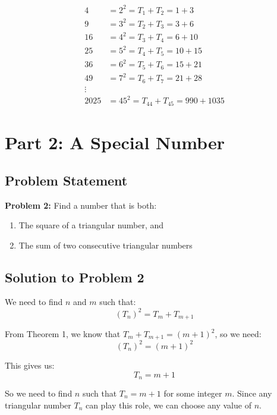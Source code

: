 \documentclass[12pt]{article}
\begin{document}
\begin{align*}
4 &= 2^2 = T_1 + T_2 = 1 + 3 \\
9 &= 3^2 = T_2 + T_3 = 3 + 6 \\
16 &= 4^2 = T_3 + T_4 = 6 + 10 \\
25 &= 5^2 = T_4 + T_5 = 10 + 15 \\
36 &= 6^2 = T_5 + T_6 = 15 + 21 \\
49 &= 7^2 = T_6 + T_7 = 21 + 28 \\
\vdots \\
2025 &= 45^2 = T_{44} + T_{45} = 990 + 1035
\end{align*}

\section*{Part 2: A Special Number}

\subsection*{Problem Statement}

\textbf{Problem 2:} Find a number that is both:
\begin{enumerate}[label=(\alph*)]
\item The square of a triangular number, and
\item The sum of two consecutive triangular numbers
\end{enumerate}

\subsection*{Solution to Problem 2}

We need to find $n$ and $m$ such that:
\begin{equation}
(T_n)^2 = T_m + T_{m+1}
\end{equation}

From Theorem 1, we know that $T_m + T_{m+1} = (m+1)^2$, so we need:
\begin{equation}
(T_n)^2 = (m+1)^2
\end{equation}

This gives us:
\begin{equation}
T_n = m+1
\end{equation}

So we need to find $n$ such that $T_n = m+1$ for some integer $m$. Since any triangular number $T_n$ can play this role, we can choose any value of $n$.
\end{document}
